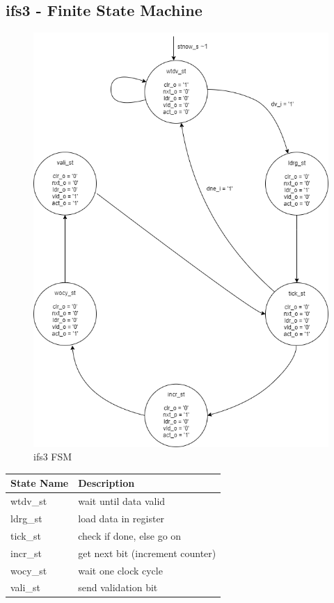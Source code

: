 \documentclass[12pt,a4 paper] {report}
\begin{document}
\subsection*{ifs3 - Finite State Machine}
\begin{figure}[h]
	\centering	
	\includegraphics[scale=0.5]{../png/ifs3.png}
	\caption{ifs3 FSM}
\end{figure}
\begin{center}
 \begin{tabular}{| p{4cm} | p{7cm} |}
	 \hline
	 \textbf{State Name} & \textbf{Description} \\
	 \hline
	 wtdv\_st & wait until data valid \\
	 \hline
	 ldrg\_st & load data in register \\
	 \hline
	 tick\_st & check if done, else go on \\
	 \hline
	 incr\_st & get next bit (increment counter) \\
	 \hline
	 wocy\_st & wait one clock cycle \\
	 \hline
	 vali\_st & send validation bit \\
	 \hline
 \end{tabular}
\end{center}
\end{document}
